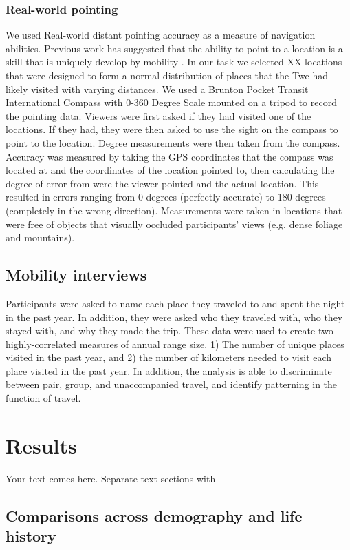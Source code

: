 		\subsubsection{Real-world pointing}
		\label{sec:2.2.2}
We used Real-world distant pointing accuracy as a measure of navigation abilities. Previous work has suggested that the ability to point to a location is a skill that is uniquely develop by mobility \cite{bell2004relationship}. In our task we selected XX locations that were designed to form a normal distribution of places that the Twe had likely visited with varying distances. We used a Brunton Pocket Transit International Compass with 0-360 Degree Scale mounted on a tripod to record the pointing data. Viewers were first asked if they had visited one of the locations. If they had, they were then asked to use the sight on the compass to point to the location. Degree measurements were then taken from the compass. Accuracy was measured by taking the GPS coordinates that the compass was located at and the coordinates of the location pointed to, then calculating the degree of error from were the viewer pointed and the actual location. This resulted in errors ranging from 0 degrees (perfectly accurate) to 180 degrees (completely in the wrong direction). Measurements were taken in locations that were free of objects that visually occluded participants’ views (e.g. dense foliage and mountains).

	\subsection{Mobility interviews}
	\label{sec:2.1}
Participants were asked to name each place they traveled to and spent the night in the past year.  In addition, they were asked who they traveled with, who they stayed with, and why they made the trip.  These data were used to create two highly-correlated measures of annual range size.  1) The number of unique places visited in the past year, and 2) the number of kilometers needed to visit each place visited in the past year.  In addition, the analysis is able to discriminate between pair, group, and unaccompanied travel, and identify patterning in the function of travel.

\section{Results}
\label{sec:3}
Your text comes here. Separate text sections with	

	\subsection{Comparisons across demography and life history}
	\label{sec:3.1}
